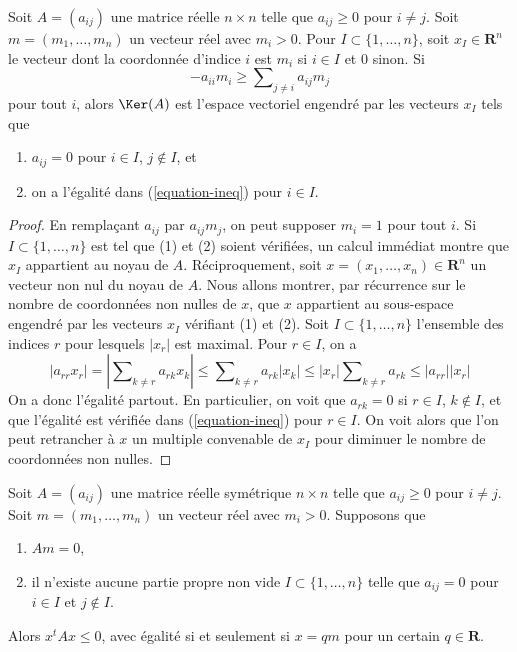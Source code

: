 \begin{lemma}
\label{lemma-recurring-real}
Soit $A = (a_{ij})$ une matrice réelle $n \times n$ telle que
$a_{ij} \geq 0$ pour $i \not = j$. Soit $m = (m_1, \ldots, m_n)$ un vecteur réel
avec $m_i > 0$. Pour $I \subset \{1, \ldots, n\}$, soit
$x_I \in \mathbf{R}^n$
le vecteur dont la coordonnée d'indice $i$ est $m_i$ si $i \in I$
et $0$ sinon. Si
\begin{equation}
\label{equation-ineq}
-a_{ii}m_i \geq \sum\nolimits_{j \not = i} a_{ij}m_j
\end{equation}
pour tout $i$, alors $\Ker(A)$ est l'espace vectoriel
engendré par les vecteurs $x_I$ tels que
\begin{enumerate}
\item $a_{ij} = 0$ pour $i \in I$, $j \not \in I$, et
\item on a l'égalité dans (\ref{equation-ineq}) pour $i \in I$.
\end{enumerate}
\end{lemma}

\begin{proof}
En remplaçant $a_{ij}$ par $a_{ij}m_j$, on peut supposer $m_i = 1$ pour tout $i$.
Si $I \subset \{1, \ldots, n\}$ est tel que (1) et (2) soient vérifiées,
un calcul immédiat montre que $x_I$ appartient au noyau de $A$.
Réciproquement, soit $x = (x_1, \ldots, x_n) \in \mathbf{R}^n$ un
vecteur non nul du noyau de $A$. Nous allons montrer, par récurrence
sur le nombre de coordonnées non nulles de $x$, que $x$ appartient au
sous-espace engendré par les vecteurs $x_I$ vérifiant (1) et (2). Soit
$I \subset \{1, \ldots, n\}$ l'ensemble des indices $r$ pour lesquels $|x_r|$ est maximal.
Pour $r \in I$, on a
$$
|a_{rr} x_r| = |\sum\nolimits_{k \not = r} a_{rk}x_k| \leq
\sum\nolimits_{k \not = r} a_{rk}|x_k| \leq
|x_r| \sum\nolimits_{k \not = r} a_{rk} \leq |a_{rr}||x_r|
$$
On a donc l'égalité partout. En particulier, on voit que
$a_{rk} = 0$ si $r \in I$, $k \not \in I$, et que l'égalité est vérifiée
dans (\ref{equation-ineq}) pour $r \in I$. On voit alors que l'on
peut retrancher à $x$ un multiple convenable de $x_I$ pour diminuer
le nombre de coordonnées non nulles.
\end{proof}

\begin{lemma}
\label{lemma-recurring-symmetric-real}
Soit $A = (a_{ij})$ une matrice réelle symétrique $n \times n$ telle que
$a_{ij} \geq 0$ pour $i \not = j$.
Soit $m = (m_1, \ldots, m_n)$ un vecteur réel avec $m_i > 0$.
Supposons que
\begin{enumerate}
\item $Am = 0$,
\item il n'existe aucune partie propre non vide $I \subset \{1, \ldots, n\}$
telle que $a_{ij} = 0$ pour $i \in I$ et $j \not \in I$.
\end{enumerate}
Alors $x^t A x \leq 0$, avec égalité si et seulement si $x = qm$
pour un certain $q \in \mathbf{R}$.
\end{lemma}

